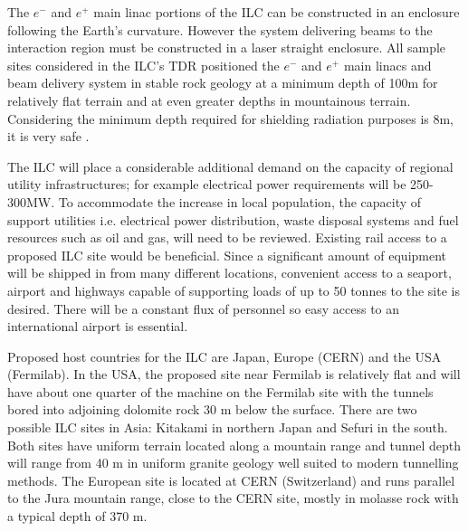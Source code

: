 The $e^-$ and $e^+$ main linac portions of the ILC can be constructed in an enclosure following the Earth's curvature. However the system delivering beams to the interaction region must be constructed in a laser straight enclosure. All sample sites considered in the ILC's TDR positioned the $e^-$ and $e^+$ main linacs and beam delivery system in stable rock geology at a minimum depth of 100m for relatively flat terrain and at even greater depths in mountainous terrain. Considering the minimum depth required for shielding radiation purposes is 8m, it is very safe \cite{ILC:PIPReport}.

The ILC will place a considerable additional demand on the capacity of regional utility infrastructures; for example electrical power requirements will be 250-300MW. To accommodate the increase in local population, the capacity of support utilities i.e. electrical power distribution, waste disposal systems and fuel resources such as oil and gas, will need to be reviewed. Existing rail access to a proposed ILC site would be beneficial. Since a significant amount of equipment will be shipped in from many different locations, convenient access to a seaport, airport and highways capable of supporting loads of up to 50 tonnes to the site is desired. There will be a constant flux of personnel so easy access to an international airport is essential.

Proposed host countries for the ILC are Japan, Europe (CERN) and the USA (Fermilab). In the USA, the proposed site near Fermilab is relatively flat and will have about one quarter of the machine on the Fermilab site with the tunnels bored into adjoining dolomite rock 30 m below the surface. There are two possible ILC sites in Asia: Kitakami in northern Japan and Sefuri in the south. Both sites have uniform terrain located along a mountain range and tunnel depth will range from 40 m in uniform granite geology well suited to modern tunnelling methods. The European site is located at CERN (Switzerland) and runs parallel to the Jura mountain range, close to the CERN site, mostly in molasse rock with a typical depth of 370 m. \cite{ILC:TechnicalDesignReport}

